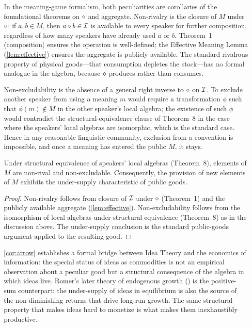 In the meaning-game formalism, both peculiarities are corollaries of
the foundational theorems on $\mathbin{\diamond}$ and aggregate. Non-rivalry
is the closure of $M$ under $\mathbin{\diamond}$: if $a,b\in M$, then
$a\mathbin{\diamond} b\in\mathcal{I}$ is available to every speaker for further
composition, regardless of how many speakers have already used $a$ or
$b$. Theorem~1 (composition) ensures the operation is well-defined;
the Effective Meaning Lemma (\cref{lem:effective}) ensures the
aggregate is publicly available. The standard rivalrous property of
physical goods---that consumption depletes the stock---has no formal
analogue in the algebra, because $\mathbin{\diamond}$ produces rather than
consumes.

Non-excludability is the absence of a general right inverse to
$\mathbin{\diamond}$ on $\mathcal{I}$. To exclude another speaker from using a
meaning $m$ would require a transformation $\phi$ such that
$\phi(m)\not\in M$ in the other speaker's local algebra; the
existence of such $\phi$ would contradict the structural-equivalence
clause of Theorem~8 in the case where the speakers' local algebras
are isomorphic, which is the standard case. Hence in any reasonable
linguistic community, exclusion from a convention is impossible, and
once a meaning has entered the public $M$, it stays.

\begin{corollary}\label{cor:arrow}
Under structural equivalence of speakers' local algebras (Theorem~8),
elements of $M$ are non-rival and non-excludable. Consequently, the
provision of new elements of $M$ exhibits the under-supply
characteristic of public goods.
\end{corollary}

\begin{proof}
Non-rivalry follows from closure of $\mathcal{I}$ under $\mathbin{\diamond}$
(Theorem~1) and the publicly available aggregate
(\cref{lem:effective}). Non-excludability follows from the
isomorphism of local algebras under structural equivalence
(Theorem~8) as in the discussion above. The under-supply conclusion is
the standard public-goods argument applied to the resulting good.
\end{proof}

\cref{cor:arrow} establishes a formal bridge between Idea Theory and
the economics of information: the special status of ideas as
commodities is not an empirical observation about a peculiar good but
a structural consequence of the algebra in which ideas live. Romer's
later theory of endogenous growth (\cite{Romer1990}) is the
positive-sum counterpart: the under-supply of ideas in equilibrium is
also the source of the non-diminishing returns that drive long-run
growth. The same structural property that makes ideas hard to monetize
is what makes them inexhaustibly productive.

